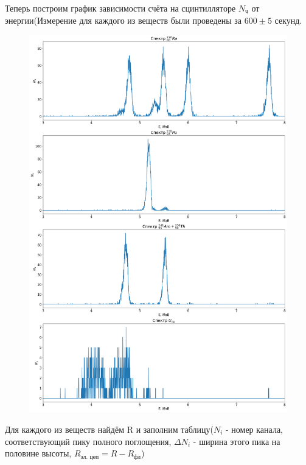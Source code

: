 \documentclass[a4paper,12pt]{article}
\begin{document}
\newpage
Теперь построим график зависимости счёта на сцинтилляторе $N_\text{ч}$ от энергии(Измерение для каждого из веществ были проведены за $600 \pm 5$ секунд.
\begin{figure}[H]
\centering
\includegraphics[scale=0.35]{graph2.png}
\end{figure}

Для каждого из веществ найдём R и заполним таблицу($N_i$ - номер канала, соответствующий пику полного поглощения, $\Delta N_i$ - ширина этого пика на половине высоты, $R_\text{эл. цеп} = R - R_\text{фл}$)
\end{document}
